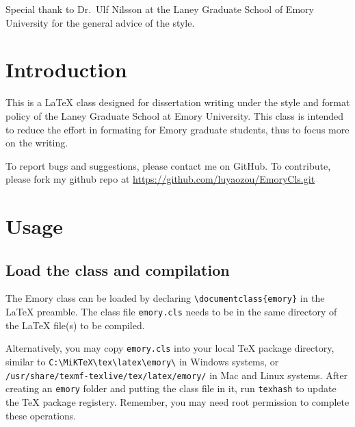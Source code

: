\documentclass[draft]{emory}
\begin{document}
\begin{acknowledgement}
Special thank to Dr.~Ulf Nilsson at the Laney Graduate School of Emory University
for the general advice of the style.

\end{acknowledgement}

\maketoc

\chapter{Introduction}

This is a \LaTeX{} class designed for dissertation writing under the style and
format policy of the Laney Graduate School at Emory University.\autocite{emory-style}
This class is
intended to reduce the effort in formating for Emory graduate students, thus 
to focus more on the writing. 

To report bugs and suggestions, please contact me on GitHub. To contribute, 
please fork my github repo at \url{https://github.com/luyaozou/EmoryCls.git}

\chapter{Usage}
\section{Load the class and compilation}
The Emory class can be loaded by declaring
\Verb|\documentclass{emory}| in the \LaTeX{} preamble. The class file
\Verb|emory.cls| needs to be in the same directory of the \LaTeX{} file(s) to be 
compiled. 

Alternatively, you may copy \Verb|emory.cls| into your local \TeX{} package 
directory, similar to \Verb|C:\MiKTeX\tex\latex\emory\| in Windows systems, or\\
\Verb|/usr/share/texmf-texlive/tex/latex/emory/| in Mac and Linux systems. After
creating an \Verb|emory| folder and putting the class file in it, run
\Verb|texhash| to update the \TeX{} package registery. Remember, you may need
root permission to complete these operations. 
\end{document}
